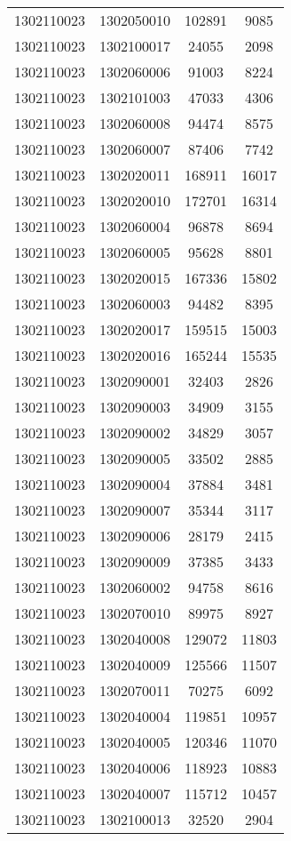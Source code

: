 \begin{longtable}{llcc}
1302110023 & 1302050010 & 102891 & 9085\\
1302110023 & 1302100017 & 24055 & 2098\\
1302110023 & 1302060006 & 91003 & 8224\\
1302110023 & 1302101003 & 47033 & 4306\\
1302110023 & 1302060008 & 94474 & 8575\\
1302110023 & 1302060007 & 87406 & 7742\\
1302110023 & 1302020011 & 168911 & 16017\\
1302110023 & 1302020010 & 172701 & 16314\\
1302110023 & 1302060004 & 96878 & 8694\\
1302110023 & 1302060005 & 95628 & 8801\\
1302110023 & 1302020015 & 167336 & 15802\\
1302110023 & 1302060003 & 94482 & 8395\\
1302110023 & 1302020017 & 159515 & 15003\\
1302110023 & 1302020016 & 165244 & 15535\\
1302110023 & 1302090001 & 32403 & 2826\\
1302110023 & 1302090003 & 34909 & 3155\\
1302110023 & 1302090002 & 34829 & 3057\\
1302110023 & 1302090005 & 33502 & 2885\\
1302110023 & 1302090004 & 37884 & 3481\\
1302110023 & 1302090007 & 35344 & 3117\\
1302110023 & 1302090006 & 28179 & 2415\\
1302110023 & 1302090009 & 37385 & 3433\\
1302110023 & 1302060002 & 94758 & 8616\\
1302110023 & 1302070010 & 89975 & 8927\\
1302110023 & 1302040008 & 129072 & 11803\\
1302110023 & 1302040009 & 125566 & 11507\\
1302110023 & 1302070011 & 70275 & 6092\\
1302110023 & 1302040004 & 119851 & 10957\\
1302110023 & 1302040005 & 120346 & 11070\\
1302110023 & 1302040006 & 118923 & 10883\\
1302110023 & 1302040007 & 115712 & 10457\\
1302110023 & 1302100013 & 32520 & 2904\\

\end{longtable}
